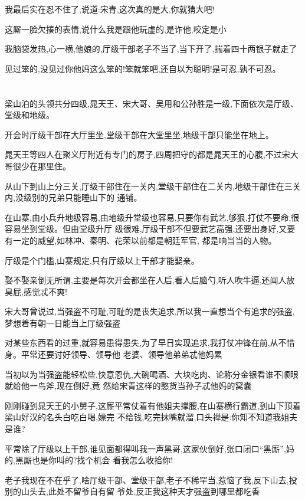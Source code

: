 ﻿\documentclass[12pt]{article}
\begin{document}
我最后实在忍不住了,说道:宋青,这次真的是大,你就猜大吧!

这厮一脸欠揍的表情,说什么我是跟他玩虚的,是诈他,咬定是小

我脑袋发热,心一横,他娘的,厅级干部老子不当了,当下开了,揣着四十两银子就走了

见过笨的,没见过你他妈这么笨的!笨就笨吧,还自以为聪明!是可忍,孰不可忍。

\section{}

梁山泊的头领共分四级,晁天王、宋大哥、吴用和公孙胜是一级,下面依次是厅级、堂级和地级。

开会时厅级干部在大厅里坐,堂级干部在大堂里坐,地级干部只能坐在地上。

晁天王等四人在聚义厅附近有专门的房子,四周把守的都是晁天王的心腹,不过宋大哥很少在那里住。

从山下到山上分三关,厅级干部住在一关内,堂级干部住在二关内,地级干部住在三关内,没级别的兄弟只能睡山下的
通铺。

在山寨,由小兵升地级容易,由地级升堂级也容易,只要你有武艺,够狠,打仗不要命,很容易坐到堂级。但由堂级升厅
级很难,厅级干部不但要武艺高强,还要出身好,又要有一定的威望,如林冲、秦明、花荣\dldots 以前都是朝廷军官,
都是响当当的人物。

厅级是个门槛,山寨规定,只有厅级以上干部才能娶亲。

娶不娶亲倒无所谓,主要是每次开会都坐在人后,看人后脑勺,听人吹牛逼,还闻人放臭屁,感觉忒不爽!

宋大哥曾说过,当强盗不可耻,可耻的是丧失追求,所以我一直想当个有追求的强盗,梦想着有朝一日能当上厅级强盗

对某些东西看的过重,就容易患得患失,为了早日实现追求,我打仗冲锋在前,从不惜身。平常还要讨好领导、领导他
老婆、领导他弟弟\dldots 忒他妈累

当初以为当强盗能轻松些,快意恩仇,大碗喝酒、大块吃肉、论称分金银\dldots 看谁不顺眼就给他一鸟斧,现在倒好,竟
然给宋青这样的憨货当孙子\dldots 忒他妈的窝囊

刚刚碰到晁天王的小舅子,这厮平常仗着有他姐夫撑腰,在山寨横行霸道,到山下顶着梁山好汉的名头白吃白喝,嫖完
不给钱,吃完抹嘴就溜,口头禅是:你知不知道我姐夫是谁?

平常除了厅级以上干部,谁见面都得叫我一声黑哥,这家伙倒好,张口闭口``黑厮'',妈的,黑厮也是你叫的?找个机会
看我怎么收拾你!

老子我现在不在乎了,啥厅级干部、堂级干部,老子不稀罕当,惹恼了我,反下山去,投别的山头去,此处不留爷自有留
爷处,反正我这种天才强盗到哪里都吃香
\end{document}
